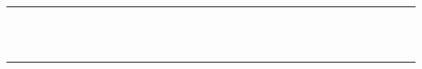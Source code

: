 \documentclass[a4paper]{article}
\begin{document}
\begin{table}[!htbp]
\begin{tabular}{|l|l|l|l|l|l|l|l|l|l|l|l|l|l|l|l|l|l|l|l|l|l|l|l|l|l|l|l|l|l|l|l|l|l|l|l|}
 & & & & & & & & & \cellcolor{mygray} & & & & & \cellcolor{mygray} & \cellcolor{mygray} & \cellcolor{mygray} & & & & & \cellcolor{mygray} & & & & & & & & & & & & & & \\ \hline 
 & & & & & & & & & & \cellcolor{mygray} & & & & & \cellcolor{mygray} & \cellcolor{mygray} & \cellcolor{mygray} & & & & & \cellcolor{mygray} & & & & & & & & & & & & & \\ \hline 
 & & & & & & & & & & & & & & & & & & & & & & & & & & & & & & & & & & & \\ \hline 
 & & & & & & & & & & & & & & & & & & & & & & & & & & & & & & & & & & & \\ \hline 
 & & & & & & & & & & & & & \cellcolor{mygray} & & & & & \cellcolor{mygray} & \cellcolor{mygray} & \cellcolor{mygray} & & & & & \cellcolor{mygray} & & & & & & & & & & \\ \hline 
 & & & & & & & & & & & & & & \cellcolor{mygray} & & & & & \cellcolor{mygray} & \cellcolor{mygray} & \cellcolor{mygray} & & & & & \cellcolor{mygray} & & & & & & & & & \\ \hline 
 & & & & & & & & & & & & & & & \cellcolor{mygray} & & & & & \cellcolor{mygray} & \cellcolor{mygray} & \cellcolor{mygray} & & & & & \cellcolor{mygray} & & & & & & & & \\ \hline 
 & & & & & & & & & & & & & & & & \cellcolor{mygray} & & & & & \cellcolor{mygray} & \cellcolor{mygray} & \cellcolor{mygray} & & & & & \cellcolor{mygray} & & & & & & & \\ \hline 
 & & & & & & & & & & & & & & & & & & & & & & & & & & & & & & & & & & & \\ \hline 
 & & & & & & & & & & & & & & & & & & & & & & & & & & & & & & & & & & & \\ \hline 
 & & & & & & & & & & & & & & & & & & & \cellcolor{mygray} & & & & & \cellcolor{mygray} & \cellcolor{mygray} & \cellcolor{mygray} & & & & & \cellcolor{mygray} & & & & \\ \hline 
 & & & & & & & & & & & & & & & & & & & & \cellcolor{mygray} & & & & & \cellcolor{mygray} & \cellcolor{mygray} & \cellcolor{mygray} & & & & & \cellcolor{mygray} & & & \\ \hline 
 & & & & & & & & & & & & & & & & & & & & & \cellcolor{mygray} & & & & & \cellcolor{mygray} & \cellcolor{mygray} & \cellcolor{mygray} & & & & & \cellcolor{mygray} & & \\ \hline 
 & & & & & & & & & & & & & & & & & & & & & & \cellcolor{mygray} & & & & & \cellcolor{mygray} & \cellcolor{mygray} & \cellcolor{mygray} & & & & & \cellcolor{mygray} & \\ \hline 

\end{tabular}
\end{table}
\end{document}
